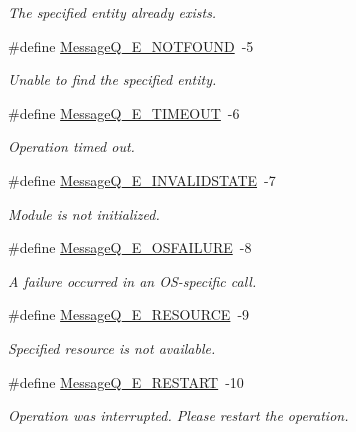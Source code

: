 \begin{DoxyCompactItemize}
\begin{DoxyCompactList}\small\item\em The specified entity already exists. \end{DoxyCompactList}\item 
\#define \hyperlink{_message_q_8h_ab629c8afd0ce8a14f60ee791fdb7c3e4}{Message\-Q\-\_\-\-E\-\_\-\-N\-O\-T\-F\-O\-U\-N\-D}~-\/5
\begin{DoxyCompactList}\small\item\em Unable to find the specified entity. \end{DoxyCompactList}\item 
\#define \hyperlink{_message_q_8h_a7aa8fb2d3e83b747e767f1c117a657c7}{Message\-Q\-\_\-\-E\-\_\-\-T\-I\-M\-E\-O\-U\-T}~-\/6
\begin{DoxyCompactList}\small\item\em Operation timed out. \end{DoxyCompactList}\item 
\#define \hyperlink{_message_q_8h_a52b7b795b2970498c39d71647a11685b}{Message\-Q\-\_\-\-E\-\_\-\-I\-N\-V\-A\-L\-I\-D\-S\-T\-A\-T\-E}~-\/7
\begin{DoxyCompactList}\small\item\em Module is not initialized. \end{DoxyCompactList}\item 
\#define \hyperlink{_message_q_8h_a8a0891b652f3cd1a15ebdd7a4d030d09}{Message\-Q\-\_\-\-E\-\_\-\-O\-S\-F\-A\-I\-L\-U\-R\-E}~-\/8
\begin{DoxyCompactList}\small\item\em A failure occurred in an O\-S-\/specific call. \end{DoxyCompactList}\item 
\#define \hyperlink{_message_q_8h_af713143259d456df28379635afbbb398}{Message\-Q\-\_\-\-E\-\_\-\-R\-E\-S\-O\-U\-R\-C\-E}~-\/9
\begin{DoxyCompactList}\small\item\em Specified resource is not available. \end{DoxyCompactList}\item 
\#define \hyperlink{_message_q_8h_a955261f8c7412eab163bff9349591927}{Message\-Q\-\_\-\-E\-\_\-\-R\-E\-S\-T\-A\-R\-T}~-\/10
\begin{DoxyCompactList}\small\item\em Operation was interrupted. Please restart the operation. \end{DoxyCompactList}\item 

\end{DoxyCompactItemize}
